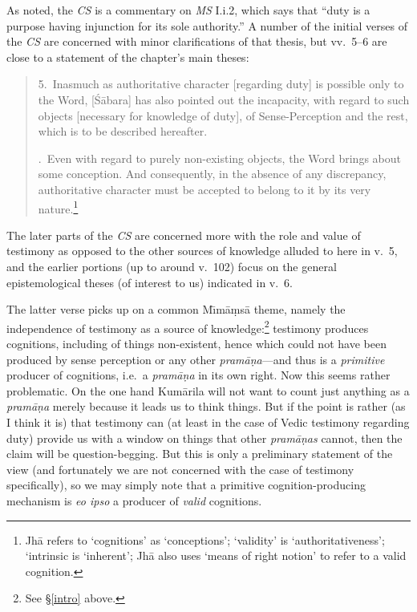 \documentclass[11pt,letterpaper,oneside]{amsart}
\newcommand{\e}{\emph}
\newenvironment{squote}{\begin{quote}\sf\small}{\rm\end{quote}} %
\begin{document}
As noted, the \e{CS} is a commentary on \emph{MS} I.i.2, which says that ``duty is a purpose having injunction for its sole authority.'' A number of the initial verses of the \emph{CS} are concerned with minor clarifications of that thesis, but vv.\ 5--6 are close to a statement of the chapter's main theses:\begin{squote}5.\ Inasmuch as authoritative character [regarding duty] is possible only to the Word, [\footnotesize\'S\small \=abara] has also pointed out the incapacity, with regard to such objects [necessary for knowledge of duty], of Sense-Perception and the rest, which is to be described hereafter.

.\ Even with regard to purely non-existing objects, the Word brings about some conception. And consequently, in the absence of any discrepancy, authoritative character must be accepted to belong to it by its very nature.\footnote{Jh\=a refers to `cognitions' as `conceptions'; `validity' is `authoritativeness'; `intrinsic is `inherent'; Jh\=a also uses `means of right notion' to refer to a valid cognition.}\end{squote} The later parts of the \emph{CS} are concerned more with the role and value of testimony as opposed to the other sources of knowledge alluded to here in v.\ 5, and the earlier portions (up to around v.\ 102) focus on the general epistemological theses (of interest to us) indicated in v.\ 6.

The latter verse picks up on a common M\={\i}m\=a\d ms\=a theme, namely the independence of testimony as a source of knowledge:\footnote{See \S\ref{intro} above.} testimony produces cognitions, including of things non-existent, hence which could not have been produced by sense perception or any other \e{pram\=a\d na}---and thus is a \emph{primitive} producer of cognitions, i.e.\ a \emph{pram\=a\d na} in its own right. Now this seems rather problematic. On the one hand Kum\=arila will not want to count just anything as a \emph{pram\=a\d na} merely because it leads us to think things. But if the point is rather (as I think it is) that testimony can (at least in the case of Vedic testimony regarding duty) provide us with a window on things that other \emph{pram\=a\d nas} cannot, then the claim will be question-begging. But this is only a preliminary statement of the view (and fortunately we are not concerned with the case of testimony specifically), so we may simply note that a primitive cognition-producing mechanism is \emph{eo ipso} a producer of \emph{valid} cognitions.%
\end{document}
